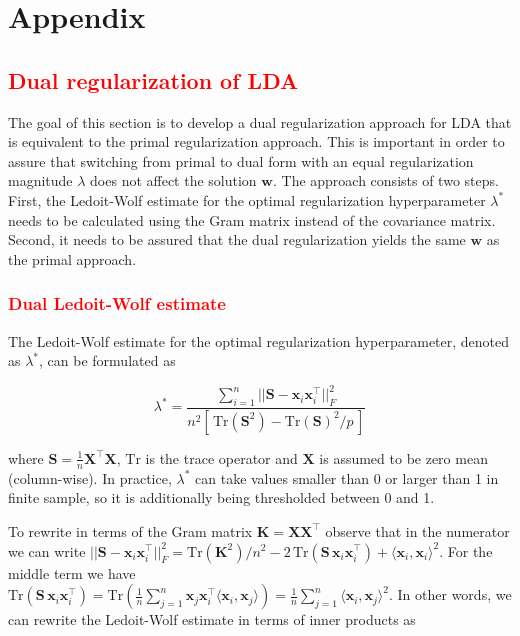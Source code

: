 \documentclass[utf8]{frontiersSCNS} %
\newcommand{\w}{\mathbf{w}}
\newcommand{\x}{\mathbf{x}}
\newcommand{\K}{\mathbf{K}}
\renewcommand{\S}{\mathbf{S}}
\newcommand{\Tr}[1]{\text{Tr}(#1)}
\newcommand{\X}{\mathbf{X}}
\newcommand{\red}[1]{\textcolor{red}{#1}}
\begin{document}
\section{Appendix}

\red{\subsection{Dual regularization of LDA}\label{app:dualLDA}}

The goal of this section is to develop a dual regularization approach for LDA that is equivalent to the primal regularization approach. This is important in order to assure that switching from primal to dual form with an equal regularization magnitude $\lambda$ does not affect the solution $\w$. The approach consists of two steps. First, the Ledoit-Wolf estimate for the optimal regularization hyperparameter $\lambda^*$ needs to be calculated using the Gram matrix instead of the covariance matrix. Second, it needs to be assured that the dual regularization yields the same $\w$ as the primal approach.

\red{\subsubsection{Dual Ledoit-Wolf estimate}}

The Ledoit-Wolf estimate \citep{Ledoit2003HoneyMatrix,Blankertz2011} for the optimal regularization hyperparameter, denoted as $\lambda^*$, can be formulated as 

\begin{equation}\label{eq:LedoitWolf}
\lambda^* = \frac{\sum_{i=1}^n ||\S - \x_i\x_i^\top||_F^2}%
{n^2 [\,\Tr{\S^2} - \Tr{\S}^2/p\,]}
\end{equation}

where $\mathbf{S}= \frac{1}{n}\X^\top\X$, $\text{Tr}$ is the trace operator and $\X$ is assumed to be zero mean (column-wise). In practice, $\lambda^*$ can take values smaller than 0 or larger than 1 in finite sample, so it is additionally being thresholded between 0 and 1. 

To rewrite  in terms of the Gram matrix $\K= \X\X^\top$ observe that in the numerator we can write $||\S - \x_i\x_i^\top||_F^2 = \Tr{\K^2}/n^2 - 2\,\Tr{\S\,\x_i\x_i^\top} + \langle\x_i,\x_i\rangle^2$. For the middle term we have $\Tr{\S\,\x_i\x_i^\top} = \Tr{\frac{1}{n}\sum_{j=1}^n \x_j\x_i^\top\langle\x_i,\x_j\rangle} = \frac{1}{n}\sum_{j=1}^n \langle\x_i,\x_j\rangle^2$. In other words, we can rewrite the Ledoit-Wolf estimate in terms of inner products as 
\end{document}
